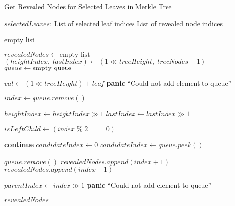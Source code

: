 \documentclass[twoside,11pt]{report}
\theoremstyle{definition}
\theoremstyle{plain}
\begin{document}
\begin{algorithm}
\caption{Get Revealed Nodes for Selected Leaves in Merkle Tree}
\begin{algorithmic}[1]
\Require $selectedLeaves$: List of selected leaf indices
\Ensure List of revealed node indices

        \State \Return empty list
    \EndIf

    \State $revealedNodes \gets \text{empty list}$
    \State $(heightIndex,\; lastIndex) \gets (1 \ll treeHeight,\; treeNodes - 1)$
    \State $queue \gets \text{empty queue}$

    
     
        \State $val \gets (1 \ll treeHeight) + leaf$
            \State \textbf{panic} ``Could not add element to queue''
        \EndIf
    \EndFor

     
        \State $index \gets queue.remove()$
        
            \State $heightIndex \gets heightIndex \gg 1$
            \State $lastIndex \gets lastIndex \gg 1$
        \EndIf

        \State $isLeftChild \gets (index \; \% \; 2 == 0)$

            \State \textbf{continue}
        \Else
            \State $candidateIndex \gets 0$
                \State $candidateIndex \gets queue.peek()$
            \EndIf

                \State $queue.remove()$
                \State $revealedNodes.append(index + 1)$
            \Else
                \State $revealedNodes.append(index - 1)$
            \EndIf
        \EndIf

        \State $parentIndex \gets index \gg 1$
            \State \textbf{panic} ``Could not add element to queue''
        \EndIf
    \EndWhile

    \State \Return $revealedNodes$
\EndFunction

\end{algorithmic}
\end{algorithm}
\end{document}
